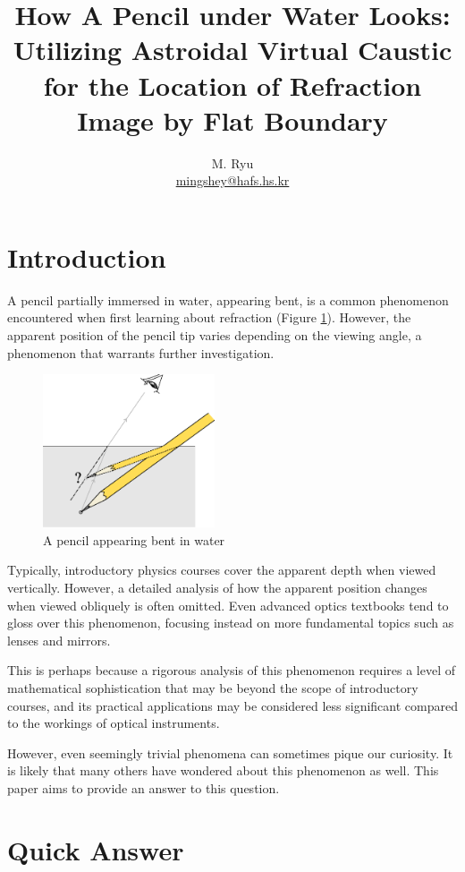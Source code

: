 \documentclass[twocolumn]{article}
\title{How A Pencil under Water Looks:\\\Large{Utilizing Astroidal Virtual Caustic for the Location of Refraction Image by Flat Boundary}}
\author{M. Ryu \\ {\href{mailto:mingshey@hafs.hs.kr}{mingshey@hafs.hs.kr}}}
\begin{document}
\maketitle
%
%
\section{Introduction}

A pencil partially immersed in water, appearing bent, is a common phenomenon encountered when first learning about refraction (Figure \ref{fig:pencil}). However, the apparent position of the pencil tip varies depending on the viewing angle, a phenomenon that warrants further investigation.

\begin{figure}[ht]
	\centering
	\includegraphics[width=2in]{figs/g164.eps}
	\caption{A pencil appearing bent in water}
	\label{fig:pencil}
\end{figure}

Typically, introductory physics courses cover the apparent depth when viewed vertically. However, a detailed analysis of how the apparent position changes when viewed obliquely is often omitted. Even advanced optics textbooks tend to gloss over this phenomenon, focusing instead on more fundamental topics such as lenses and mirrors.

This is perhaps because a rigorous analysis of this phenomenon requires a level of mathematical sophistication that may be beyond the scope of introductory courses, and its practical applications may be considered less significant compared to the workings of optical instruments. 

However, even seemingly trivial phenomena can sometimes pique our curiosity. It is likely that many others have wondered about this phenomenon as well. This paper aims to provide an answer to this question.


\section{Quick Answer}
\end{document}
